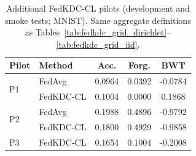 \begin{table}[t]
\centering
\footnotesize
\caption{Additional FedKDC-CL pilots (development and smoke tests; MNIST). Same aggregate definitions as Tables~\ref{tab:fedkdc_grid_dirichlet}--\ref{tab:fedkdc_grid_iid}.}
\label{tab:fedkdc_extra_runs}
\renewcommand{\arraystretch}{1.12}
\begin{tabular}{@{}llccc@{}}
\toprule
\textbf{Pilot} & \textbf{Method} & \textbf{Acc.} & \textbf{Forg.} & \textbf{BWT} \\
\midrule
\multirow{2}{*}{P1}
 & FedAvg & 0.0964 & 0.0392 & -0.0784 \\
 & FedKDC-CL & 0.1004 & 0.0000 & 0.1868 \\
\midrule
\multirow{2}{*}{P2}
 & FedAvg & 0.1988 & 0.4896 & -0.9792 \\
 & FedKDC-CL & 0.1800 & 0.4929 & -0.9858 \\
\midrule
P3 & FedKDC-CL & 0.1654 & 0.1004 & -0.2008 \\
\bottomrule
\end{tabular}
\end{table}
